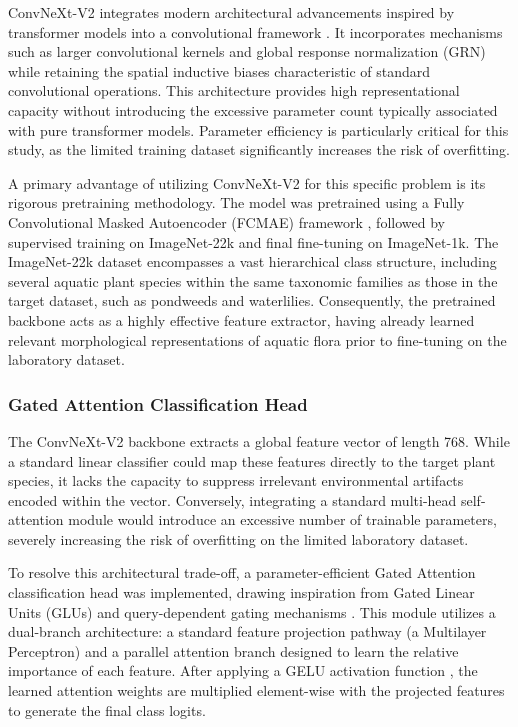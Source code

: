 \documentclass[final,3p,times,twocolumn]{elsarticle}
\begin{document}
ConvNeXt-V2 integrates modern architectural advancements inspired by transformer models into a convolutional framework \cite{Wooetal2023}. It incorporates mechanisms such as larger convolutional kernels and global response normalization (GRN) while retaining the spatial inductive biases characteristic of standard convolutional operations. This architecture provides high representational capacity without introducing the excessive parameter count typically associated with pure transformer models. Parameter efficiency is particularly critical for this study, as the limited training dataset significantly increases the risk of overfitting.

A primary advantage of utilizing ConvNeXt-V2 for this specific problem is its rigorous pretraining methodology. The model was pretrained using a Fully Convolutional Masked Autoencoder (FCMAE) framework \cite{Wooetal2023}, followed by supervised training on ImageNet-22k and final fine-tuning on ImageNet-1k. The ImageNet-22k dataset encompasses a vast hierarchical class structure, including several aquatic plant species within the same taxonomic families as those in the target dataset, such as pondweeds and waterlilies. Consequently, the pretrained backbone acts as a highly effective feature extractor, having already learned relevant morphological representations of aquatic flora prior to fine-tuning on the laboratory dataset.

\subsubsection{Gated Attention Classification Head}

The ConvNeXt-V2 backbone extracts a global feature vector of length 768. While a standard linear classifier could map these features directly to the target plant species, it lacks the capacity to suppress irrelevant environmental artifacts encoded within the vector. Conversely, integrating a standard multi-head self-attention module would introduce an excessive number of trainable parameters, severely increasing the risk of overfitting on the limited laboratory dataset.

To resolve this architectural trade-off, a parameter-efficient Gated Attention classification head was implemented, drawing inspiration from Gated Linear Units (GLUs) \cite{Dauphinetal2017} and query-dependent gating mechanisms \cite{Qiuetal2025}. This module utilizes a dual-branch architecture: a standard feature projection pathway (a Multilayer Perceptron) and a parallel attention branch designed to learn the relative importance of each feature. After applying a GELU activation function \cite{HendrycksandGimpel2016}, the learned attention weights are multiplied element-wise with the projected features to generate the final class logits.
\end{document}
